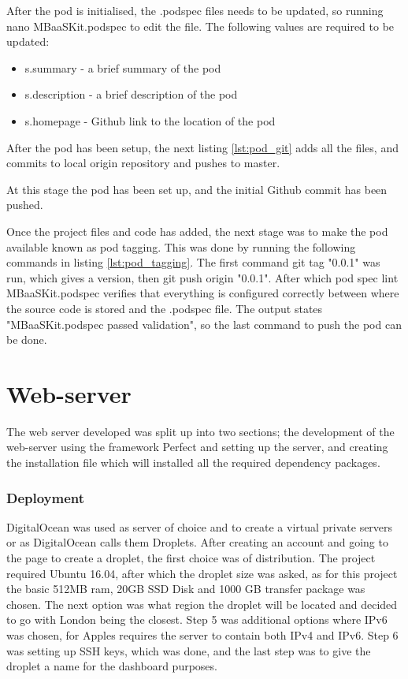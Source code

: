 After the pod is initialised, the .podspec files needs to be updated, so running nano MBaaSKit.podspec to edit the file. The following values are required to be updated: 

\begin{itemize}
  \item s.summary
  - a brief summary of the pod
  \item s.description
  - a brief description of the pod
  \item s.homepage
  - Github link to the location of the pod
\end{itemize}

After the pod has been setup, the next listing \ref{lst:pod_git} adds all the files, and commits to local origin repository and pushes to master.



At this stage the pod has been set up, and the initial Github commit has been pushed. 

Once the project files and code has added, the next stage was to make the pod available known as pod tagging. This was done by running the following commands in listing \ref{lst:pod_tagging}. The first command git tag "0.0.1" was run, which gives a version, then git push origin "0.0.1". After which pod spec lint MBaaSKit.podspec verifies that everything is configured correctly between where the source code is stored and the .podspec file. The output states "MBaaSKit.podspec passed validation", so the last command to push the pod can be done. 



\section{Web-server}

The web server developed was split up into two sections; the development of the web-server using the framework Perfect and setting up the server, and creating the installation file which will installed all the required dependency packages.

\subsubsection{Deployment}

DigitalOcean was used as server of choice and to create a virtual private servers or as DigitalOcean calls them Droplets. After creating an account and going to the page to create a droplet, the first choice was of distribution. The project required Ubuntu 16.04, after which the droplet size was asked, as for this project the basic 512MB ram, 20GB SSD Disk and 1000 GB transfer package was chosen. The next option was what region the droplet will be located and decided to go with London being the closest. Step 5 was additional options where IPv6 was chosen, for Apples requires the server to contain both IPv4 and IPv6. Step 6 was setting up SSH keys, which was done, and the last step was to give the droplet a name for the dashboard purposes.

